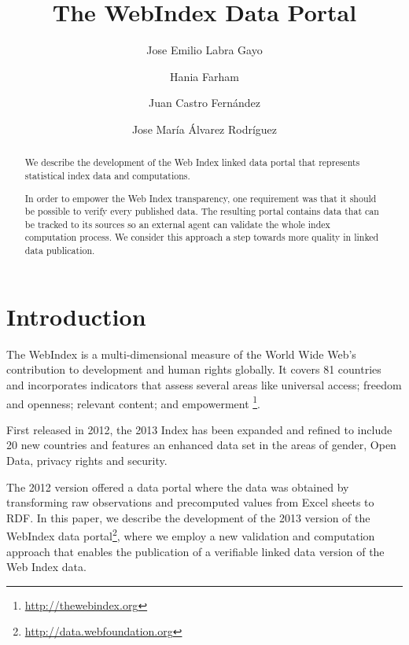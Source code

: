 \documentclass{llncs}
\newcommand{\footnoteUrl}[1]{\footnote{\url{#1}}}
\begin{document}
\title{The WebIndex Data Portal}

\author{Jose Emilio Labra Gayo 
 \and Hania Farham
 \and Juan Castro Fernández
 \and Jose María Álvarez Rodríguez}
 

\maketitle

\begin{abstract}

We describe the development of the Web Index linked data portal that represents statistical index data and computations. 

In order to empower the Web Index transparency, one requirement was that it should be possible to verify every published data.
The resulting portal contains data that can be tracked to its sources so an external agent can validate the whole index computation process. We consider this approach a step towards more quality in linked data publication.

\end{abstract}

\section{Introduction}

The WebIndex is a multi-dimensional measure of the World Wide Web’s contribution to development and human rights globally. It covers 81 countries and incorporates indicators that assess several areas like universal access; freedom and openness; relevant content; and empowerment \footnote{\url{http://thewebindex.org}}. 

First released in 2012, the 2013 Index has been expanded and refined to include 20 new countries and features an enhanced data set in the areas of gender, Open Data, privacy rights and security.

The 2012 version offered a data
portal where the data was obtained 
by transforming raw observations and precomputed values 
from Excel sheets to RDF. 
In this paper, we describe the development of the 2013 version of the WebIndex data portal\footnoteUrl{http://data.webfoundation.org}, where we employ 
a new validation and computation approach that enables the publication of a verifiable linked data version of the Web Index data.
\end{document}
